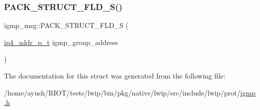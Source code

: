 \mbox{\label{structigmp__msg_a935034863490ec706ba33f238b77126a}} 
\subsubsection{\texorpdfstring{P\+A\+C\+K\+\_\+\+S\+T\+R\+U\+C\+T\+\_\+\+F\+L\+D\+\_\+\+S()}{PACK\_STRUCT\_FLD\_S()}\hspace{0.1cm}{\footnotesize\ttfamily [2/2]}}
{\footnotesize\ttfamily igmp\+\_\+msg\+::\+P\+A\+C\+K\+\_\+\+S\+T\+R\+U\+C\+T\+\_\+\+F\+L\+D\+\_\+S (\begin{DoxyParamCaption}\item[{\hyperlink{native_2lwip_2src_2include_2lwip_2prot_2ip4_8h_ae5011654fcbadf6b6582b8d49446107f}{ip4\+\_\+addr\+\_\+p\+\_\+t}}]{igmp\+\_\+group\+\_\+address }\end{DoxyParamCaption})}



The documentation for this struct was generated from the following file\+:\begin{DoxyCompactItemize}
\item 
/home/ayush/\+R\+I\+O\+T/tests/lwip/bin/pkg/native/lwip/src/include/lwip/prot/\hyperlink{native_2lwip_2src_2include_2lwip_2prot_2igmp_8h}{igmp.\+h}\end{DoxyCompactItemize}
